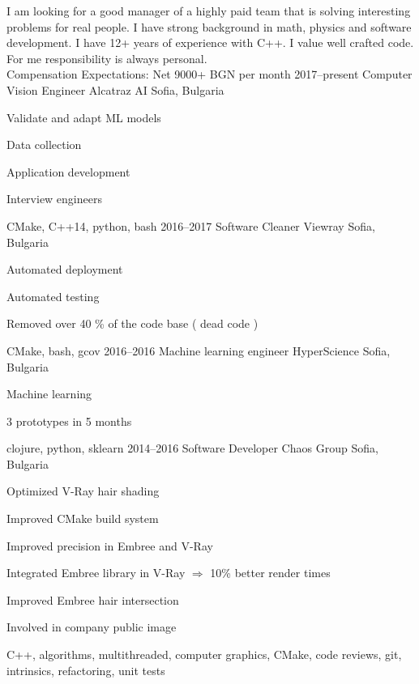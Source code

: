 I am looking for a good manager of a highly paid team that is solving
interesting problems for real people. I have strong background in math, physics
and software development. I have 12+ years of experience with C++. I value well
crafted code. For me responsibility is always personal.\\
Compensation Expectations: Net 9000+ BGN per month 
\myjobb
{2017--present}
{Computer Vision Engineer}
{Alcatraz AI}
{Sofia, Bulgaria}
{
\item Validate and adapt ML models
\item Data collection
}
{
\item Application development
\item Interview engineers 
}
{CMake, C++14, python, bash}
\myjobb
{2016--2017}
{Software Cleaner}
{Viewray}
{Sofia, Bulgaria}
{
\item Automated deployment 
\item Automated testing 
}
{
\item Removed over 40 \% of the code base ( dead code ) 
}
{CMake, bash, gcov}
\myjobb
{2016--2016}
{Machine learning engineer}
{HyperScience}
{Sofia, Bulgaria}
{
\item Machine learning 
}
{
\item 3 prototypes in 5 months
}
{clojure, python, sklearn}
\myjobb
{2014--2016}
{Software Developer}
{Chaos Group}
{Sofia, Bulgaria}
{
\item Optimized V-Ray hair shading
\item Improved CMake build system 
\item Improved precision in Embree and V-Ray
}
{
\item Integrated Embree library in V-Ray $\Rightarrow$ 10\% better render times 
\item Improved Embree hair intersection 
\item Involved in company public image
}
{C++, algorithms, multithreaded, computer graphics, CMake, code reviews, git, intrinsics, refactoring, unit tests}
